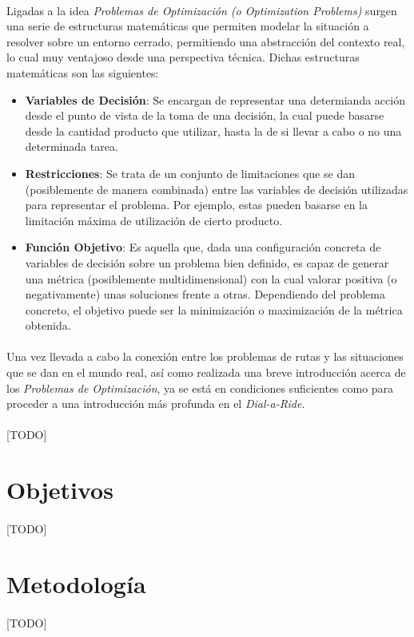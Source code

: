\documentclass{subfiles}
\begin{document}
      \paragraph{}
      Ligadas a la idea \emph{Problemas de Optimización (o Optimization Problems)} surgen una serie de estructuras matemáticas que permiten modelar la situación a resolver sobre un entorno cerrado, permitiendo una abstracción del contexto real, lo cual muy ventajoso desde una perspectiva técnica. Dichas estructuras matemáticas son las siguientes:
      \begin{itemize}

        \item \textbf{Variables de Decisión}: Se encargan de representar una determianda acción desde el punto de vista de la toma de una decisión, la cual puede basarse desde la cantidad producto que utilizar, hasta la de si llevar a cabo o no una determinada tarea.

        \item \textbf{Restricciones}: Se trata de un conjunto de limitaciones que se dan (posiblemente de manera combinada) entre las variables de decisión utilizadas para representar el problema. Por ejemplo, estas pueden basarse en la limitación máxima de utilización de cierto producto.

        \item \textbf{Función Objetivo}: Es aquella que, dada una configuración concreta de variables de decisión sobre un problema bien definido, es capaz de generar una métrica (posiblemente multidimensional) con la cual valorar positiva (o negativamente) unas soluciones frente a otras. Dependiendo del problema concreto, el objetivo puede ser la minimización o maximización de la métrica obtenida.

      \end{itemize}

      \paragraph{}
      Una vez llevada a cabo la conexión entre los problemas de rutas y las situaciones que se dan en el mundo real, así como realizada una breve introducción acerca de los \emph{Problemas de Optimización}, ya se está en condiciones suficientes como para proceder a una introducción más profunda en el \problema \emph{Dial-a-Ride}.

      \paragraph{}
      [TODO]

    \section{Objetivos}
    \label{sec:introduction_objectives}

      \paragraph{}
      [TODO]

    \section{Metodología}
    \label{sec:introduction_metodology}

      \paragraph{}
      [TODO]
\end{document}
